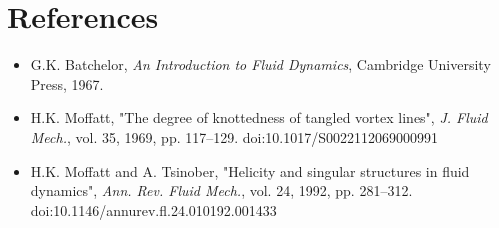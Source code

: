 \documentclass[12pt]{article}
\begin{document}
\section*{References}
\begin{itemize}[leftmargin=1.5em]
    \item G.K. Batchelor, \textit{An Introduction to Fluid Dynamics}, Cambridge University Press, 1967.
    \item H.K. Moffatt, "The degree of knottedness of tangled vortex lines", \textit{J. Fluid Mech.}, vol. 35, 1969, pp. 117–129. doi:10.1017/S0022112069000991
    \item H.K. Moffatt and A. Tsinober, "Helicity and singular structures in fluid dynamics", \textit{Ann. Rev. Fluid Mech.}, vol. 24, 1992, pp. 281–312. doi:10.1146/annurev.fl.24.010192.001433
\end{itemize}
\end{document}
